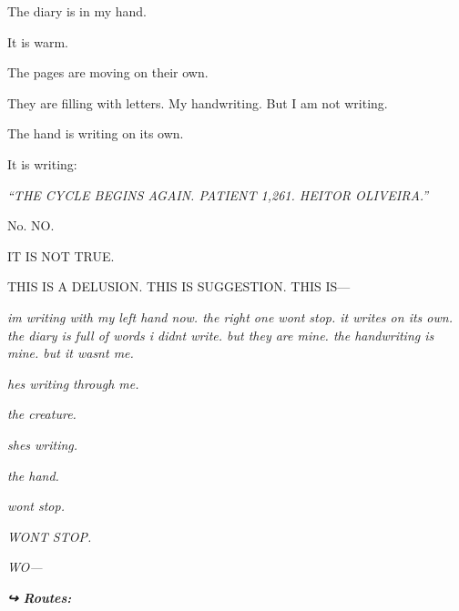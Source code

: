 \noindent The diary is in my hand.

\noindent It is warm.

\noindent The pages are moving on their own.

\noindent They are filling with letters. My handwriting. But I am not writing.

\noindent The hand is writing on its own.

\noindent It is writing:

\noindent \textit{\textquotedblleft{}THE CYCLE BEGINS AGAIN. PATIENT 1,261. HEITOR OLIVEIRA.\textquotedblright{}}

\noindent No.
NO.

\noindent IT IS NOT TRUE.

\noindent THIS IS A DELUSION. THIS IS SUGGESTION. THIS IS---

\noindent \textit{im writing with my left hand now. the right one wont stop. it writes on its own. the diary is full of words i didnt write. but they are mine. the handwriting is mine. but it wasnt me.}

\noindent \textit{hes writing through me.}

\noindent \textit{the creature.}

\noindent \textit{shes writing.}

\noindent \textit{the hand.}

\noindent \textit{wont stop.}

\noindent \textit{WONT STOP.}

\noindent \textit{WO---}

\vspace{0.5em}
\noindent\textit{\textbf{↪ Routes:}  \rotasep {} \rotasep {}}
